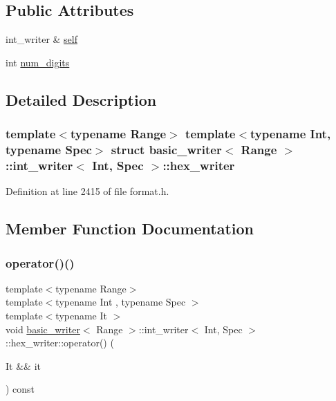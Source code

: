 \subsection*{Public Attributes}
\begin{DoxyCompactItemize}
\item 
int\+\_\+writer \& \hyperlink{structbasic__writer_1_1int__writer_1_1hex__writer_a214346e34f1462ad5a119879d3e9063e}{self}
\item 
int \hyperlink{structbasic__writer_1_1int__writer_1_1hex__writer_a34a4c667e65b0d985a2c9debe9ed3a51}{num\+\_\+digits}
\end{DoxyCompactItemize}


\subsection{Detailed Description}
\subsubsection*{template$<$typename Range$>$\newline
template$<$typename Int, typename Spec$>$\newline
struct basic\+\_\+writer$<$ Range $>$\+::int\+\_\+writer$<$ Int, Spec $>$\+::hex\+\_\+writer}



Definition at line 2415 of file format.\+h.



\subsection{Member Function Documentation}
\mbox{\label{structbasic__writer_1_1int__writer_1_1hex__writer_a1a9f7eba393b50830d2bf9cfa092d2f9}} 
\subsubsection{\texorpdfstring{operator()()}{operator()()}}
{\footnotesize\ttfamily template$<$typename Range$>$ \\
template$<$typename Int , typename Spec $>$ \\
template$<$typename It $>$ \\
void \hyperlink{classbasic__writer}{basic\+\_\+writer}$<$ Range $>$\+::int\+\_\+writer$<$ Int, Spec $>$\+::hex\+\_\+writer\+::operator() (\begin{DoxyParamCaption}\item[{It \&\&}]{it }\end{DoxyParamCaption}) const\hspace{0.3cm}{\ttfamily [inline]}}



